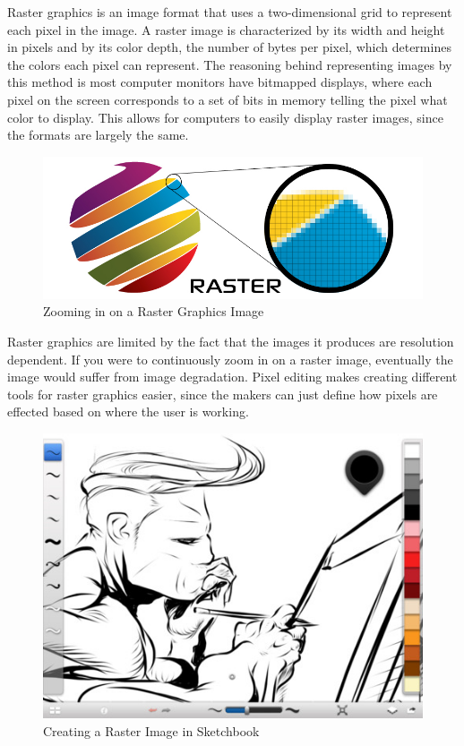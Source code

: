 \documentclass[12pt]{report}
\begin{document}
Raster graphics is an image format that uses a two-dimensional grid to represent each pixel in the image. 
A raster image is characterized by its width and height in pixels and by its color depth, the number of bytes per pixel, which determines the colors each pixel can represent.  
The reasoning behind representing images by this method is most computer monitors have bitmapped displays, where each pixel on the screen corresponds to a set of bits in memory telling the pixel what color to display. 
This allows for computers to easily display raster images, since the formats are largely the same.
\begin{figure}
\includegraphics[width=\textwidth]{raster.jpg}
\caption{Zooming in on a Raster Graphics Image}
\end{figure}




Raster graphics are limited by the fact that the images it produces are resolution dependent. 
If you were to continuously zoom in on a raster image, eventually the image would suffer from image degradation. 
Pixel editing makes creating different tools for raster graphics easier, since the makers can just define how pixels are effected based on where the user is working. 
\begin{figure}
\includegraphics[width=\textwidth]{sketchbook.jpg}
\caption{Creating a Raster Image in Sketchbook}
\end{figure}
\end{document}
